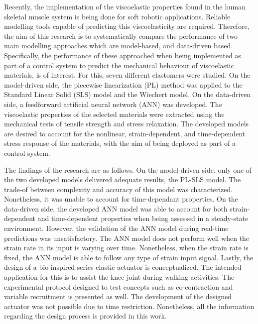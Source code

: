 


\begin{abstracts}        %


Recently, the implementation of the viscoelastic properties found in the human skeletal muscle system is being done for soft robotic applications. Reliable modelling tools capable of predicting this viscoelasticity are required. Therefore, the aim of this research is to systematically compare the performance of two main modelling approaches which are model-based, and data-driven based. Specifically, the performance of these approached when being implemented as part of a control system to predict the mechanical behaviour of viscoelastic materials, is of interest. For this, seven different elastomers were studied. On the model-driven side, the piecewise linearization (PL) method was applied to the Standard Linear Solid (SLS) model and the Wiechert model. On the data-driven side, a feedforward artificial neural network (ANN) was developed. The viscoelastic properties of the selected materials were extracted using the mechanical tests of tensile strength and stress relaxation. The developed models are desired to account for the nonlinear, strain-dependent, and time-dependent stress response of the materials, with the aim of being deployed as part of a control system.

The findings of the research are as follows. On the model-driven side, only one of the two developed models delivered adequate results, the PL-SLS model. The trade-of between complexity and accuracy of this model was characterized. Nonetheless, it was unable to account for time-dependant properties. On the data-driven side, the developed ANN model was able to account for both strain-dependent and time-dependent properties when being assessed in a steady-state environment. However, the validation of the ANN model during real-time predictions was unsatisfactory. The ANN model does not perform well when the strain rate in its input is varying over time. Nonetheless, when the strain rate is fixed, the ANN model is able to follow any type of strain input signal. Lastly, the design of a bio-inspired series-elastic actuator is conceptualized. The intended application for this is to assist the knee joint during walking activities. The experimental protocol designed to test concepts such as co-contraction and variable recruitment is presented as well. The development of the designed actuator was not possible due to time restriction. Nonetheless, all the information regarding the design process is provided in this work.


\end{abstracts}
